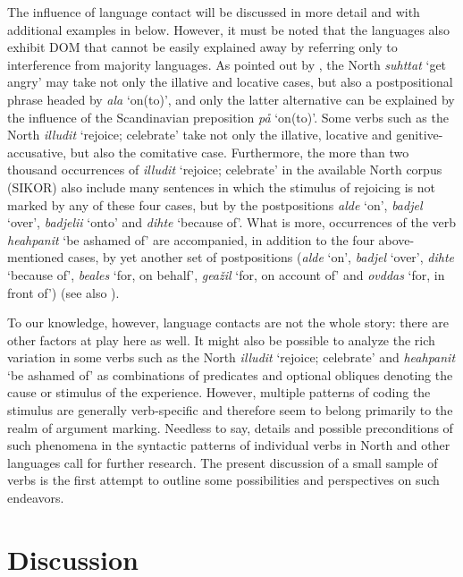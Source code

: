 \documentclass[output=paper]{LSP/langsci}
\begin{document}
The influence of language contact will be discussed in more detail and with additional examples in  below. However, it must be noted that the  languages also exhibit DOM that cannot be easily explained away by referring only to interference from majority languages. As pointed out by \citet[140–141]{Helander2001Ii}, the North  \textit{suhttat} ‘get angry’ may take not only the illative and locative cases, but also a postpositional phrase headed by \textit{ala} ‘on(to)’, and only the latter alternative can be explained by the influence of the Scandinavian preposition \textit{på} ‘on(to)’. Some verbs such as the North  \textit{illudit} ‘rejoice; celebrate’ take not only the illative, locative and genitive-accusative, but also the comitative case. Furthermore, the more than two thousand occurrences of \textit{illudit} ‘rejoice; celebrate’ in the available North  corpus (SIKOR) also include many sentences in which the stimulus of rejoicing is not marked by any of these four cases, but by the postpositions \textit{alde} ‘on’, \textit{badjel} ‘over’, \textit{badjelii} ‘onto’ and \textit{dihte} ‘because of’. What is more, occurrences of the verb \textit{heahpanit} ‘be ashamed of’ are accompanied, in addition to the four above-mentioned cases, by yet another set of postpositions (\textit{alde} ‘on’, \textit{badjel} ‘over’, \textit{dihte} ‘because of’, \textit{beales} ‘for, on behalf’, \textit{geažil} ‘for, on account of’ and \textit{ovddas} ‘for, in front of’) (see also \citealt{Ylikoski2016}).

To our knowledge, however, language contacts are not the whole story: there are other factors at play here as well. It might also be possible to analyze the rich variation in some verbs such as the North  \textit{illudit} ‘rejoice; celebrate’ and \textit{heahpanit} ‘be ashamed of’ as combinations of  predicates and optional obliques denoting the cause or stimulus of the experience. However, multiple patterns of coding the stimulus are generally verb-specific and therefore seem to belong primarily to the realm of argument marking. Needless to say, details and possible preconditions of such phenomena in the syntactic patterns of individual verbs in North  and other  languages call for further research. The present discussion of a small sample of   verbs is the first attempt to outline some possibilities and perspectives on such endeavors.

\section{Discussion}
\label{16-sec:4}
\end{document}
